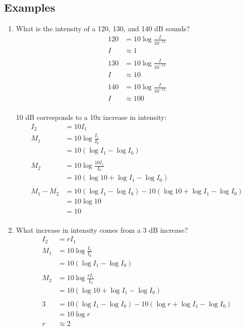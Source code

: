 \documentclass{exam}
\begin{document}
  \subsection{Examples}
  \begin{enumerate}

    \item What is the intensity of a 120, 130, and 140 dB sounds?
      \begin{align*}
        120 & = 10 \log \frac{I}{10^{-12}} \\
        I   & \approx 1 \\
        \\
        130 & = 10 \log \frac{I}{10^{-12}} \\
        I   & \approx 10 \\
        \\
        140 & = 10 \log \frac{I}{10^{-12}} \\
        I   & \approx 100 \\
      \end{align*}

      10 dB corresponds to a 10x increase in intensity:
      \begin{align*}
        I_2       &= 10 I_1 \\
        M_1       &= 10 \log \frac{I_1}{I_0} \\
                  &= 10 (\log I_1 - \log I_0 ) \\
        \\
        M_2       &= 10 \log \frac{10 I_1}{I_0} \\
                  &= 10 (\log 10 + \log I_1 - \log I_0 ) \\
        \\
        M_1 - M_2 &= 10 (\log I_1 - \log I_0 ) - 10 (\log 10 + \log I_1 - \log I_0 ) \\
                  &= 10 \log 10 \\
                  &= 10 \\
      \end{align*}

    \item What increase in intensity comes from a 3 dB increase?
      \begin{align*}
        I_2 &= r I_1 \\
        M_1 &= 10 \log \frac{I_1}{I_0} \\
            &= 10 (\log I_1 - \log I_0 ) \\
        \\
        M_2 &= 10 \log \frac{r I_1}{I_0} \\
            &= 10 (\log 10 + \log I_1 - \log I_0 ) \\
        \\
        3   &= 10 (\log I_1 - \log I_0 ) - 10 (\log r + \log I_1 - \log I_0 ) \\
            &= 10 \log r \\
        r   &\approx 2 \\
      \end{align*}

  \end{enumerate}
\end{document}
